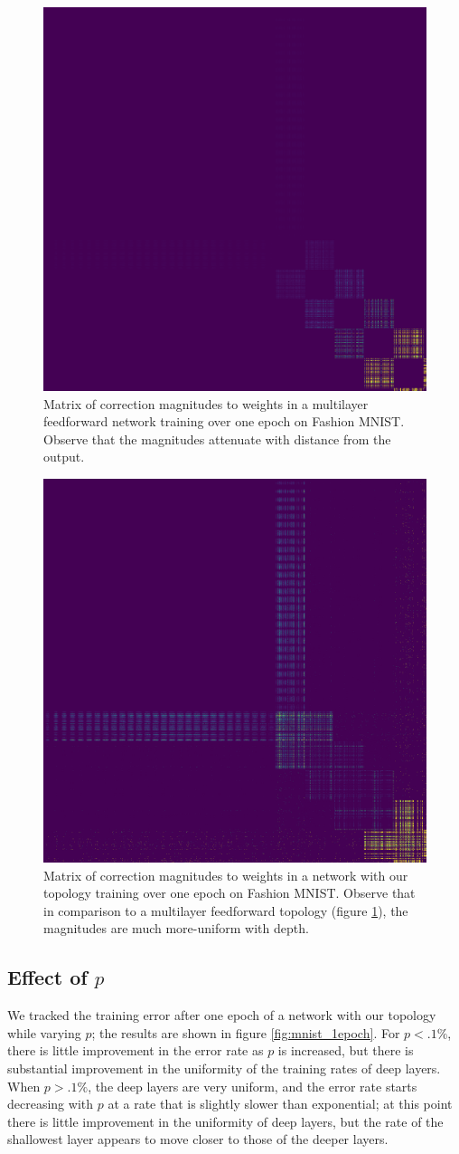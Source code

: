 \documentclass[utf8]{frontiersSCNS}
\begin{document}
\begin{figure}
\centering
\includegraphics[width=.5\textwidth]{figures/fmnist_mlff_mean_dw.png}
\caption{Matrix of correction magnitudes to weights in a multilayer feedforward network training over one epoch on Fashion MNIST. Observe that the magnitudes attenuate with distance from the output.}
\label{fig:fmnist_mlff_dw}
\end{figure}
\begin{figure}
\centering
\includegraphics[width=.5\textwidth]{figures/fmnist_sw_mean_dw.png}
\caption{Matrix of correction magnitudes to weights in a network with our topology training over one epoch on Fashion MNIST. Observe that in comparison to a multilayer feedforward topology (figure \ref{fig:fmnist_mlff_dw}), the magnitudes are much more-uniform with depth.}
\end{figure}



\subsection{Effect of $p$}
\label{sec:mnist_1epoch}

We tracked the training error after one epoch of a network with our topology while varying $p$; the results are shown in figure \ref{fig:mnist_1epoch}. For $p<.1\%$, there is little improvement in the error rate as $p$ is increased, but there is substantial improvement in the uniformity of the training rates of deep layers. When $p>.1\%$, the deep layers are very uniform, and the error rate starts decreasing with $p$ at a rate that is slightly slower than exponential; at this point there is little improvement in the uniformity of deep layers, but the rate of the shallowest layer appears to move closer to those of the deeper layers.
\end{document}
